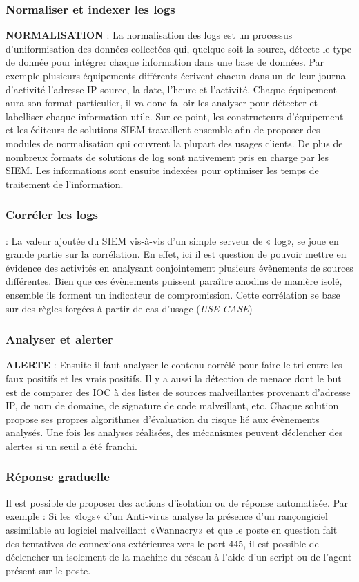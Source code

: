 \subsubsection {Normaliser et indexer les logs}
\textbf{NORMALISATION} : La normalisation des logs est un processus d’uniformisation des données collectées qui, quelque soit la source, détecte le type de donnée pour intégrer chaque information dans une base de données. Par exemple plusieurs équipements différents écrivent chacun dans un de leur journal d’activité l’adresse IP source, la date, l’heure et l’activité. Chaque équipement aura son format particulier, il va donc falloir les analyser pour détecter et labelliser chaque information utile. Sur ce point, les constructeurs d’équipement et les éditeurs de solutions SIEM travaillent ensemble afin de proposer des modules de normalisation qui couvrent la plupart des usages clients. De plus de nombreux formats de solutions de log sont nativement pris en charge par les SIEM. Les informations sont ensuite indexées pour optimiser les temps de traitement de l’information.
\subsubsection {Corréler les logs}
 : La valeur ajoutée du SIEM vis-à-vis d’un simple serveur de « log», se joue en grande partie sur la corrélation. En effet, ici il est question de pouvoir mettre en évidence des activités en analysant conjointement plusieurs évènements de sources différentes. Bien que ces évènements puissent paraître anodins de manière isolé, ensemble ils forment un indicateur de compromission. Cette corrélation se base sur des règles forgées à partir de cas d’usage (\textit{USE CASE})

\subsubsection {Analyser et alerter}
\textbf{ALERTE} : Ensuite il faut analyser le contenu corrélé pour faire le tri entre les faux positifs et les vrais positifs. Il y a aussi la détection de menace dont le but est de comparer des IOC à des listes de sources malveillantes provenant d’adresse IP, de nom de domaine, de signature de code malveillant, etc. Chaque solution propose ses propres algorithmes d’évaluation du risque lié aux évènements analysés. Une fois les analyses réalisées, des mécanismes peuvent déclencher des alertes si un seuil a été franchi. 
\subsubsection {Réponse graduelle}
Il est possible de proposer des actions d’isolation ou de réponse automatisée. Par exemple : Si les «logs» d’un Anti-virus analyse la présence d’un rançongiciel assimilable au logiciel malveillant «Wannacry» et que le poste en question fait des tentatives de connexions extérieures vers le port 445, il est possible de déclencher un isolement de la machine du réseau à l’aide d’un script ou de l’agent présent sur le poste. 





